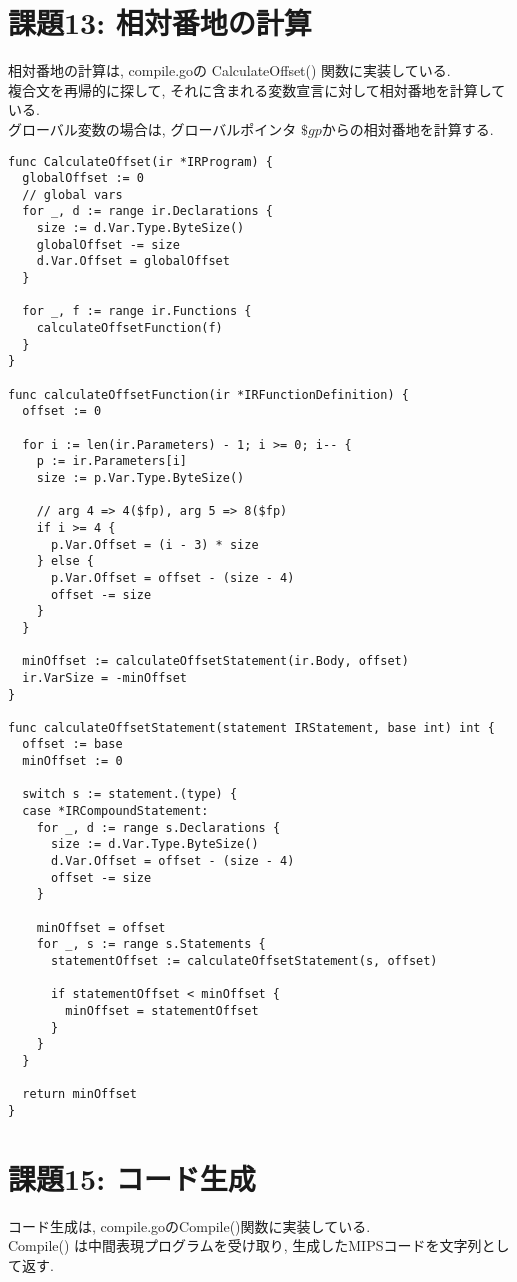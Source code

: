 \documentclass[a4j]{jarticle}
\begin{document}
\section{課題13: 相対番地の計算}
相対番地の計算は, compile.goの CalculateOffset() 関数に実装している. \\
複合文を再帰的に探して, それに含まれる変数宣言に対して相対番地を計算している. \\
グローバル変数の場合は, グローバルポインタ $ \$gp $からの相対番地を計算する.

\begin{verbatim}
func CalculateOffset(ir *IRProgram) {
  globalOffset := 0
  // global vars
  for _, d := range ir.Declarations {
    size := d.Var.Type.ByteSize()
    globalOffset -= size
    d.Var.Offset = globalOffset
  }

  for _, f := range ir.Functions {
    calculateOffsetFunction(f)
  }
}

func calculateOffsetFunction(ir *IRFunctionDefinition) {
  offset := 0

  for i := len(ir.Parameters) - 1; i >= 0; i-- {
    p := ir.Parameters[i]
    size := p.Var.Type.ByteSize()

    // arg 4 => 4($fp), arg 5 => 8($fp)
    if i >= 4 {
      p.Var.Offset = (i - 3) * size
    } else {
      p.Var.Offset = offset - (size - 4)
      offset -= size
    }
  }

  minOffset := calculateOffsetStatement(ir.Body, offset)
  ir.VarSize = -minOffset
}

func calculateOffsetStatement(statement IRStatement, base int) int {
  offset := base
  minOffset := 0

  switch s := statement.(type) {
  case *IRCompoundStatement:
    for _, d := range s.Declarations {
      size := d.Var.Type.ByteSize()
      d.Var.Offset = offset - (size - 4)
      offset -= size
    }

    minOffset = offset
    for _, s := range s.Statements {
      statementOffset := calculateOffsetStatement(s, offset)

      if statementOffset < minOffset {
        minOffset = statementOffset
      }
    }
  }

  return minOffset
}
\end{verbatim}

\section{課題15: コード生成}
コード生成は, compile.goのCompile()関数に実装している. \\
Compile() は中間表現プログラムを受け取り, 生成したMIPSコードを文字列として返す. \\
\end{document}
